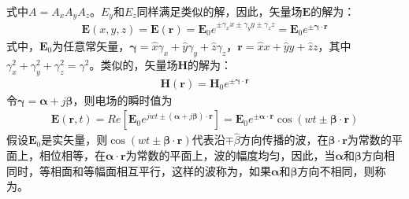 \documentclass{article}
\numberwithin{equation}{section}
\renewcommand{\vec}[1]{\boldsymbol{#1}}
\begin{document}
式中$A=A_xA_yA_z$。$E_y$和$E_z$同样满足类似的解，因此，矢量场$\mathbf{E}$的解为：
\begin{align}
    \label{eq:eq331}
    \mathbf{E}(x,y,z)=\mathbf{E}(\vec{r})=\mathbf{E}_0e^{\pm\gamma_xx\pm\gamma_yy\pm\gamma_zz}=\mathbf{E}_0e^{\pm\vec{\gamma}\cdot\vec{r}}
\end{align}
式中，$\mathbf{E}_0$为任意常矢量，$\vec{\gamma}=\hat{x}\gamma_x+\hat{y}\gamma_y+\hat{z}\gamma_z$，$\vec{r}=\hat{x}x+\hat{y}y+\hat{z}z$，其中$\gamma_x^2+\gamma_y^2+\gamma_z^2=\gamma^2$。类似的，矢量场$\mathbf{H}$的解为：
\begin{align}
    \label{eq:eq332}
    \mathbf{H}(\vec{r})=\mathbf{H}_0e^{\pm\vec{\gamma}\cdot\vec{r}}
\end{align}
令$\vec{\gamma}=\vec{\alpha}+j\vec{\beta}$，则电场的瞬时值为
\begin{align}
    \label{eq:eq333}
    \mathcal{\vec{E}}(\vec{r},t)=Re\left[\mathbf{E}_0e^{jwt\pm(\vec{\alpha}+j\vec{\beta})\cdot\vec{r}}\right]=\mathbf{E}_0e^{\pm\vec{\alpha}\cdot\vec{r}}\cos(wt\pm\vec{\beta}\cdot\vec{r})
\end{align}
假设$\mathbf{E}_0$是实矢量，则$\cos(wt\pm\vec{\beta}\cdot\vec{r})$代表沿$\mp\hat{\beta}$方向传播的波，在$\vec{\beta}\cdot\vec{r}$为常数的平面上，相位相等，在$\vec{\alpha}\cdot\vec{r}$为常数的平面上，波的幅度均匀，因此，当$\vec{\alpha}$和$\vec{\beta}$方向相同时，等相面和等幅面相互平行，这样的波称为\textbf{\color{blue}{均匀平面波}}，如果$\vec{\alpha}$和$\vec{\beta}$方向不相同，则称为\textbf{\color{blue}{非均匀平面波}}。
\end{document}
